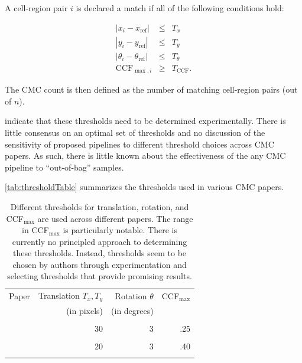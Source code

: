 A cell-region pair \(i\) is declared a match if all of the following
conditions hold:

\begin{eqnarray}\label{eq:original}
|x_i - x_{\text{ref}}| &\leq& T_{x} \\ \nonumber
|y_i - y_{\text{ref}}| &\leq& T_{y} \\ \nonumber
|\theta_i - \theta_{\text{ref}}| &\leq& T_{\theta} \\ \nonumber
\text{CCF}_{\max,i} &\geq& T_{\text{CCF}}.
\end{eqnarray}

The CMC count is then defined as the number of matching cell-region
pairs (out of \(n\)).

\citet{song_3d_2014} indicate that these thresholds need to be
determined experimentally. There is little consensus on an optimal set
of thresholds and no discussion of the sensitivity of proposed pipelines
to different threshold choices across CMC papers. As such, there is
little known about the effectiveness of the any CMC pipeline to
``out-of-bag'' samples.

\autoref{tab:thresholdTable} summarizes the thresholds used in various
CMC papers.

\begin{table}[ht]
\centering
\begin{tabular}{|lrrr|}
\hline
Paper & Translation $T_x, T_y$ & Rotation $\theta$ & CCF$_{\max}$ \\
& (in pixels) & (in degrees) \\
\hline
\cellcolor{lightgray}{\citet{song_3d_2014}} & \cellcolor{lightgray}{20} &
\cellcolor{lightgray}{6} & \cellcolor{lightgray}{.60} \\

\citet{tong_fired_2014} & 30 & 3 & .25 \\

\cellcolor{lightgray}{\citet{tong_improved_2015}} & \cellcolor{lightgray}{15} &
\cellcolor{lightgray}{3} & \cellcolor{lightgray}{.55} \\

\citet{chen_convergence_2017} & 20 & 3 & .40 \\

\cellcolor{lightgray}{\citet{song_estimating_2018}} & \cellcolor{lightgray}{20} &
\cellcolor{lightgray}{6} & \cellcolor{lightgray}{.50}\\
\hline
\end{tabular}
\caption{Different thresholds for translation, rotation, and CCF$_{\max}$ are used across different papers. The range in CCF$_{\max}$ is particularly notable. There is currently no principled approach to determining these thresholds. Instead, thresholds seem to be chosen by authors through experimentation and selecting thresholds that provide promising results.}
\label{tab:thresholdTable}
\end{table}

